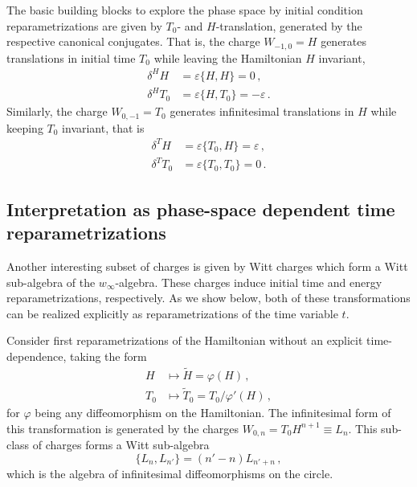 \documentclass[onecolumn,notitlepage,superscriptaddress, nofootinbib,nobibnotes, aps,prd,10pt]{revtex4-1}%
\begin{document}
The basic building blocks to explore the phase space by initial condition reparametrizations are given by $T_0$- and $H$-translation, generated by the respective canonical conjugates. That is, the charge $W_{-1,0} = H$ generates translations in initial time $T_0$ while leaving the Hamiltonian $H$ invariant,
%
\begin{subequations}
\begin{align}
    \delta^H H &= \varepsilon\{H,H\} = 0\, ,\\[7pt]
    \delta^H T_0 &= \varepsilon\{H,T_0\} = -\varepsilon\, .
\end{align}
\end{subequations}
%
Similarly, the charge $W_{0,-1} = T_0$ generates infinitesimal translations in $H$ while keeping $T_0$ invariant, that is
%
\begin{subequations}
\begin{align}
    \delta^{T}H &= \varepsilon\{T_0,H\} = \varepsilon\, ,\\[7pt]
    \delta^T T_0 &= \varepsilon\{T_0,T_0\} = 0\, .
\end{align}
\end{subequations}

\subsection{Interpretation as phase-space dependent time reparametrizations}



Another interesting subset of charges is given by Witt charges which form a Witt sub-algebra of the $w_\infty$-algebra. These charges induce initial time and energy reparametrizations, respectively. As we show below, both of these transformations can be realized explicitly as reparametrizations of the time variable $t$. 

Consider first reparametrizations of the Hamiltonian without an explicit time-dependence, taking the form 
%
\begin{subequations}\label{eq:H reparametrization}
\begin{align}
    H&\mapsto \tilde{H} = \varphi(H)\, ,\\[7pt]
    T_0&\mapsto \tilde{T}_0 = T_0/\varphi'(H)\, ,\label{eq:H reparam: T0}
\end{align}
\end{subequations}
%
for $\varphi$ being any diffeomorphism on the Hamiltonian. The infinitesimal form of this transformation is generated by the charges $W_{0,n} = T_0 H^{n+1}\equiv L_n$. This sub-class of charges forms a Witt sub-algebra
%
\begin{equation}\label{eq:Witt algebra}
\{L_n,L_{n'}\} = (n'-n)L_{n'+n}\, ,
\end{equation}
%
which is the algebra of infinitesimal diffeomorphisms on the circle. 
\end{document}

